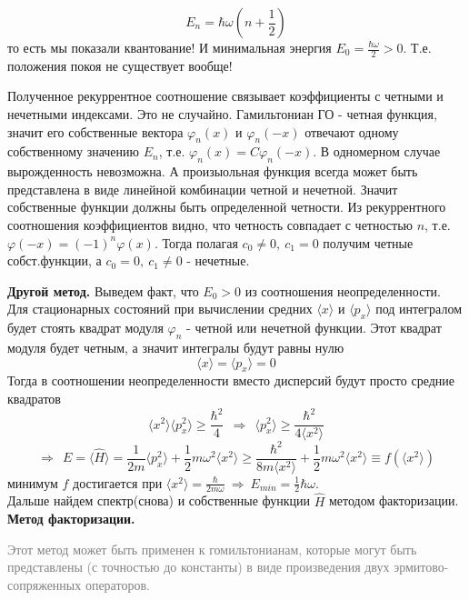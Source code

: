 			$$
				E_n = \hbar\omega\left(n + \frac{1}{2}\right)
			$$
			то есть мы показали квантование! И минимальная энергия $E_0 = \frac{\hbar\omega}{2}>0$. Т.е. положения покоя не существует вообще!
			\bigskip
			\begin{scriptsize}
			\begin{spacing}{0.3}
				Полученное рекуррентное соотношение связывает коэффициенты с четными и нечетными индексами. Это не случайно. Гамильтониан ГО - четная функция, значит его собственные вектора $\varphi_n(x)$ и $\varphi_n(-x)$ отвечают одному собственному значению $E_n$, т.е. $\varphi_n(x) = C\varphi_n(-x)$. В одномерном случае вырожденность невозможна. А произыольная функция всегда может быть представлена в виде линейной комбинации четной и нечетной. Значит собственные функции должны быть определенной четности. Из рекуррентного соотношения коэффициентов видно, что четность совпадает с четностью $n$, т.е. $\varphi(-x) = (-1)^n\varphi(x)$. Тогда полагая $c_0 \ne 0, \ c_1 = 0$ получим четные собст.функции, а $c_0=0, \ c_1\ne0$ - нечетные. 
			\end{spacing}
			\end{scriptsize}
			\bigskip
			\textbf{Другой метод.} Выведем факт, что $E_0>0$ из соотношения неопределенности.\\
			Для стационарных состояний при вычислении средних $\langle x \rangle$ и $\langle p_x \rangle$ под интегралом будет стоять квадрат модуля $\varphi_n$ - четной или нечетной функции. Этот квадрат модуля будет четным, а значит интегралы будут равны нулю
			$$
				\langle x \rangle = \langle p_x \rangle = 0
			$$
			Тогда в соотношении неопределенности вместо дисперсий будут просто средние квадратов
			$$
				\langle x^2 \rangle \langle p_x^2 \rangle \ge \frac{\hbar^2}{4} \ \ \Rightarrow \ \ \langle p_x^2 \rangle \ge \frac{\hbar^2}{4\langle x^2 \rangle}
			$$ 
			$$
				\Rightarrow \ \ E = \langle \hat{H} \rangle = \frac{1}{2m}\langle p_x^2 \rangle + \frac{1}{2}m\omega^2\langle x^2 \rangle \ge \frac{\hbar^2}{8m\langle x^2 \rangle} + \frac{1}{2}m\omega^2\langle x^2 \rangle \equiv f(\langle x^2 \rangle)
			$$
			минимум $f$ достигается при $\langle x^2 \rangle = \frac{\hbar}{2m\omega} \ \Rightarrow \ E_{min} = \frac{1}{2}\hbar\omega$.\\
			\noindent Дальше найдем спектр(снова) и собственные функции $\hat{H}$ методом факторизации.\\
			\textbf{Метод факторизации.}\\
			\begin{scriptsize}
			\begin{spacing}{0.3}
			\textcolor{gray}{
				Этот метод может быть применен к гомильтонианам, которые могут быть представлены (с точностью до константы) в виде произведения двух эрмитово-сопряженных операторов.
			}	
			\end{spacing}
			\end{scriptsize}
